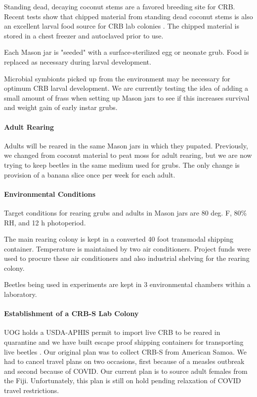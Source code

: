 \documentclass[12pt,letterpaper,english,bibliography=totocnumbered,abstract=on]{scrartcl}
\begin{document}
Standing dead, decaying coconut stems are a favored breeding site for CRB. Recent tests show that chipped material from standing dead coconut stems is also an excellent larval food source for CRB lab colonies \cite{graselaLarvalDietExperiment2021}. The chipped material is stored in a chest freezer and autoclaved prior to use.

Each Mason jar is "seeded" with a surface-sterilized egg or neonate grub. Food is replaced as necessary during larval development. 

Microbial symbionts picked up from the environment may be necessary for optimum CRB larval development. We are currently testing the idea of adding a small amount of frass when setting up Mason jars to see if this increases survival and weight gain of early instar grubs.

\paragraph{Adult Rearing}

Adults will be reared in the same Mason jars in which they pupated. Previously, we changed from coconut material to peat moss for adult rearing, but we are now trying to keep beetles in the same medium used for grubs. The only change is provision of a banana slice once per week for each adult.

\paragraph{Environmental Conditions}

Target conditions for rearing grubs and adults in Mason jars are 80 deg. F, 80\% RH, and 12 h photoperiod. 

The main rearing colony is kept in a converted 40 foot transmodal shipping container. Temperature is maintained by two air conditioners. Project funds were used to procure these air conditioners and also industrial shelving for the rearing colony. 

Beetles being used in experiments are kept in 3 environmental chambers within a laboratory.

\paragraph{Establishment of a CRB-S Lab Colony}

UOG holds a USDA-APHIS permit to import live CRB to be reared in quarantine \cite{usda-aphis_crb_2019, moore_additional_2019} and we have  built escape proof shipping containers for transporting live beetles \cite{moore_container_2017-1}. Our original plan was to collect CRB-S from American Samoa. We had to cancel travel plans on two occasions, first because of a measles outbreak and second because of COVID.  Our current plan is to source adult females from the Fiji. Unfortunately, this plan is still on hold pending relaxation of COVID travel restrictions.
\end{document}
